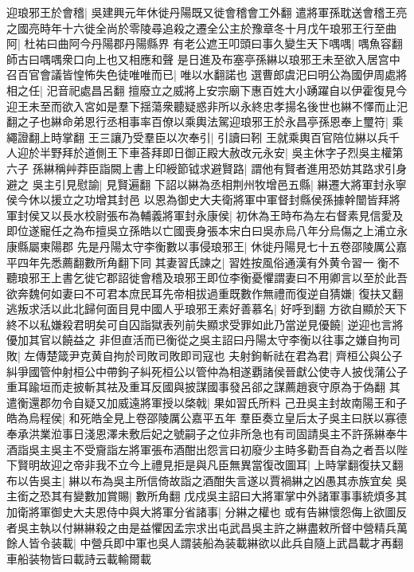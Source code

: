 迎琅邪王於會稽|{
	吳建興元年休徙丹陽既又徙會稽會工外翻}
遣將軍孫耽送會稽王亮之國亮時年十六徙全尚於零陵尋追殺之遷全公主於豫章冬十月戊午琅邪王行至曲阿|{
	杜祐曰曲阿今丹陽郡丹陽縣界}
有老公遮王叩頭曰事久變生天下喁喁|{
	喁魚容翻師古曰喁喁衆口向上也又相應和聲}
是日進及布塞亭孫綝以琅邪王未至欲入居宫中召百官會議皆惶怖失色徒唯唯而已|{
	唯以水翻諾也}
選曹郎虞汜曰明公為國伊周處將相之任|{
	汜音祀處昌呂翻}
擅廢立之威將上安宗廟下惠百姓大小踴躍自以伊霍復見今迎王未至而欲入宮如是羣下揺蕩衆聽疑惑非所以永終忠孝揚名後世也綝不懌而止汜翻之子也綝命弟恩行丞相事率百僚以乘輿法駕迎琅邪王於永昌亭孫恩奉上璽符|{
	乘繩證翻上時掌翻}
王三讓乃受羣臣以次奉引|{
	引讀曰靷}
王就乘輿百官陪位綝以兵千人迎於半野拜於道側王下車荅拜即日御正殿大赦改元永安|{
	吳主休字子烈吳主權第六子}
孫綝稱艸莽臣詣闕上書上印綬節钺求避賢路|{
	謂他有賢者進用恐妨其路求引身避之}
吳主引見慰諭|{
	見賢遍翻}
下詔以綝為丞相荆州牧增邑五縣|{
	綝遷大將軍封永寧侯今休以援立之功增其封邑}
以恩為御史大夫衛將軍中軍督封縣侯孫據幹闓皆拜將軍封侯又以長水校尉張布為輔義將軍封永康侯|{
	初休為王時布為左右督素見信愛及即位遂寵任之為布擅吳立孫皓以亡國喪身張本宋白曰吳赤烏八年分烏傷之上浦立永康縣屬東陽郡}
先是丹陽太守李衡數以事侵琅邪王|{
	休徙丹陽見七十五卷邵陵厲公嘉平四年先悉薦翻數所角翻下同}
其妻習氏諫之|{
	習姓按風俗通漢有外黄令習一}
衡不聽琅邪王上書乞徙它郡詔徙會稽及琅邪王即位李衡憂懼謂妻曰不用卿言以至於此吾欲奔魏何如妻曰不可君本庶民耳先帝相拔過重既數作無禮而復逆自猜嫌|{
	復扶又翻}
逃叛求活以此北歸何面目見中國人乎琅邪王素好善慕名|{
	好呼到翻}
方欲自顯於天下終不以私嫌殺君明矣可自囚詣獄表列前失顯求受罪如此乃當逆見優饒|{
	逆迎也言將優加其官以饒益之}
非但直活而已衡從之吳主詔曰丹陽太守李衡以往事之嫌自拘司敗|{
	左傳楚箴尹克黄自拘於司敗司敗即司寇也}
夫射鉤斬祛在君為君|{
	齊桓公與公子糾爭國管仲射桓公中帶鉤子糾死桓公以管仲為相遂覇諸侯晉獻公使寺人披伐蒲公子重耳踰垣而走披斬其袪及重耳反國與披謀國事發呂郤之謀薦趙衰守原為于偽翻}
其遣衡還郡勿令自疑又加威遠將軍授以棨戟|{
	果如習氏所料}
己丑吳主封故南陽王和子皓為烏程侯|{
	和死皓全見上卷邵陵厲公嘉平五年}
羣臣奏立皇后太子吳主曰朕以寡德奉承洪業涖事日淺恩澤未敷后妃之號嗣子之位非所急也有司固請吳主不許孫綝奉牛酒詣吳主吳主不受齎詣左將軍張布酒酣出怨言曰初廢少主時多勸吾自為之者吾以陛下賢明故迎之帝非我不立今上禮見拒是與凡臣無異當復改圖耳|{
	上時掌翻復扶又翻}
布以告吳主|{
	綝以布為吳主所信倚故詣之酒酣失言遂以賈禍綝之凶愚其赤族宜矣}
吳主銜之恐其有變數加賞賜|{
	數所角翻}
戊戍吳主詔曰大將軍掌中外諸軍事事統煩多其加衛將軍御史大夫恩侍中與大將軍分省諸事|{
	分綝之權也}
或有告綝懷怨侮上欲圖反者吳主執以付綝綝殺之由是益懼因孟宗求出屯武昌吳主許之綝盡敕所督中營精兵萬餘人皆令装載|{
	中營兵即中軍也吳人謂装船為装載綝欲以此兵自隨上武昌載才再翻車船装物皆曰載詩云載輸爾載}
